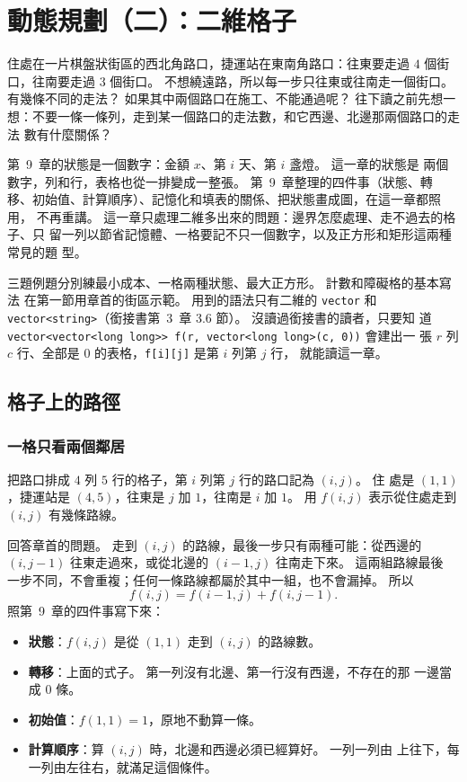 \chapter{動態規劃（二）：二維格子}
\label{ch:dp2d}

住處在一片棋盤狀街區的西北角路口，捷運站在東南角路口：往東要走過 $4$ 個街
口，往南要走過 $3$ 個街口。 不想繞遠路，所以每一步只往東或往南走一個街口。
有幾條不同的走法？ 如果其中兩個路口在施工、不能通過呢？ 往下讀之前先想一
想：不要一條一條列，走到某一個路口的走法數，和它西邊、北邊那兩個路口的走法
數有什麼關係？

第~9~章的狀態是一個數字：金額 $x$、第 $i$ 天、第 $i$ 盞燈。 這一章的狀態是
兩個數字，列和行，表格也從一排變成一整張。 第~9~章整理的四件事（狀態、轉
移、初始值、計算順序）、記憶化和填表的關係、把狀態畫成圖，在這一章都照用，
不再重講。 這一章只處理二維多出來的問題：邊界怎麼處理、走不過去的格子、只
留一列以節省記憶體、一格要記不只一個數字，以及正方形和矩形這兩種常見的題
型。

三題例題分別練最小成本、一格兩種狀態、最大正方形。 計數和障礙格的基本寫法
在第一節用章首的街區示範。 用到的語法只有二維的 \texttt{vector} 和
\texttt{vector<string>}（銜接書第~3~章 3.6 節）。 沒讀過銜接書的讀者，只要知
道 \texttt{vector<vector<long long>> f(r, vector<long long>(c, 0))} 會建出一
張 $r$ 列 $c$ 行、全部是 $0$ 的表格，\texttt{f[i][j]} 是第 $i$ 列第 $j$ 行，
就能讀這一章。

\section{格子上的路徑}
\label{sec:dp2-paths}

\subsection{一格只看兩個鄰居}
\label{sec:dp2-two}

把路口排成 $4$ 列 $5$ 行的格子，第 $i$ 列第 $j$ 行的路口記為 $(i, j)$。 住
處是 $(1, 1)$，捷運站是 $(4, 5)$，往東是 $j$ 加 $1$，往南是 $i$ 加 $1$。 用
$f(i, j)$ 表示從住處走到 $(i, j)$ 有幾條路線。

回答章首的問題。 走到 $(i, j)$ 的路線，最後一步只有兩種可能：從西邊的
$(i, j - 1)$ 往東走過來，或從北邊的 $(i - 1, j)$ 往南走下來。 這兩組路線最後
一步不同，不會重複；任何一條路線都屬於其中一組，也不會漏掉。 所以
\[
f(i, j) = f(i - 1, j) + f(i, j - 1).
\]
照第~9~章的四件事寫下來：

\begin{itemize}
\item \textbf{狀態}：$f(i, j)$ 是從 $(1, 1)$ 走到 $(i, j)$ 的路線數。
\item \textbf{轉移}：上面的式子。 第一列沒有北邊、第一行沒有西邊，不存在的那
一邊當成 $0$ 條。
\item \textbf{初始值}：$f(1, 1) = 1$，原地不動算一條。
\item \textbf{計算順序}：算 $(i, j)$ 時，北邊和西邊必須已經算好。 一列一列由
上往下，每一列由左往右，就滿足這個條件。
\end{itemize}

